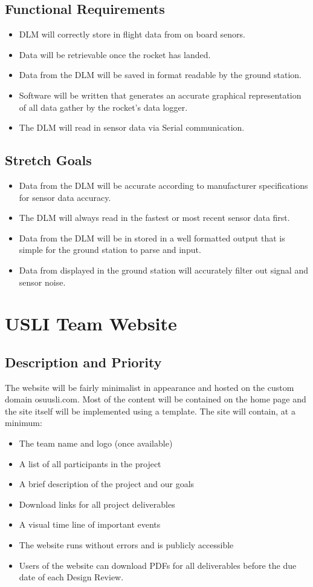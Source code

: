\documentclass{scrreprt}
\begin{document}
\subsection{Functional Requirements}
\begin{itemize}
\item DLM will correctly store in flight data from on board senors.
\item Data will be retrievable once the rocket has landed.
\item Data from the DLM will be saved in format readable by the ground station.
\item Software will be written that generates an accurate graphical representation of all data gather by the rocket's data logger.
\item The DLM will read in sensor data via Serial communication.
\end{itemize}
\subsection{Stretch Goals}
\begin{itemize}
\item Data from the DLM will be accurate according to manufacturer specifications for sensor data accuracy.
\item The DLM will always read in the fastest or most recent sensor data first.
\item Data from the DLM will be in stored in a well formatted output that is simple for the ground station to parse and input.
\item Data from displayed in the ground station will accurately filter out signal and sensor noise.
\end{itemize}


\section{USLI Team Website }
\subsection{Description and Priority}
The website will be fairly minimalist in appearance and hosted on the custom domain osuusli.com. Most of the content will be contained on the home page and the site itself will be implemented using a template. The site will contain, at a minimum:
\begin{itemize}
\item The team name and logo (once available)
\item A list of all participants in the project
\item A brief description of the project and our goals
\item Download links for all project deliverables
\item A visual time line of important events
\item The website runs without errors and is publicly accessible
\item Users of the website can download PDFs for all deliverables before the due date of each Design Review.
\end{itemize}
\end{document}
